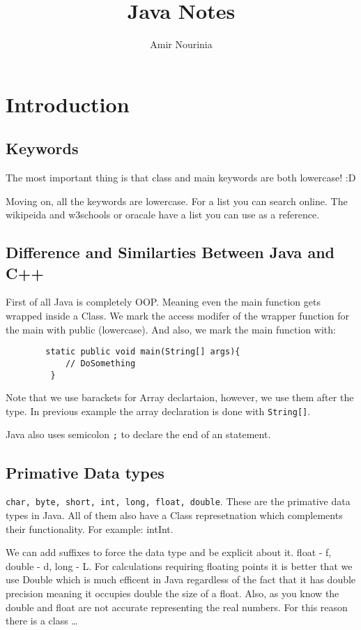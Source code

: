 \documentclass[11pt,twoside,a4paper]{report}
\title{Java Notes}
\author{Amir Nourinia}
\begin{document}
\maketitle
\tableofcontents
\chapter{Introduction}
\section{Keywords}
The most important thing is that class and main keywords are both lowercase! :D

Moving on, all the keywords are lowercase. For a list you can search online. The wikipeida and w3schools or oracale have a list you can use as a reference.
\section{Difference and Similarties Between Java and C++}
First of all Java is completely OOP. Meaning even the main function gets wrapped inside a Class.
We mark the access modifer of the wrapper function for the main with public (lowercase). And also, we mark
the main function with:

\begin{lstlisting}
        static public void main(String[] args){
            // DoSomething
         }
        \end{lstlisting}

Note that we use barackets for Array declartaion, however, we use them after the type. In previous example the array declaration is done
with \verb|String[]|.

Java also uses semicolon \verb|;| to declare the end of an statement.

\section{Primative Data types}
\verb|char, byte, short, int, long, float, double|. These are the primative data types in Java. All of them also have a Class represetnation
which complements their functionality. For example: int\textrightarrow Int.

We can add suffixes to force the data type and be explicit about it. float - f, double - d, long - L.
For calculations requiring floating points it is better that we use Double which is much efficent in Java regardless of the fact that it has double precision meaning it occupies double the size
of a float. Also, as you know the double and float are not accurate representing the real numbers. For this reason there is a class \dots
\end{document}
